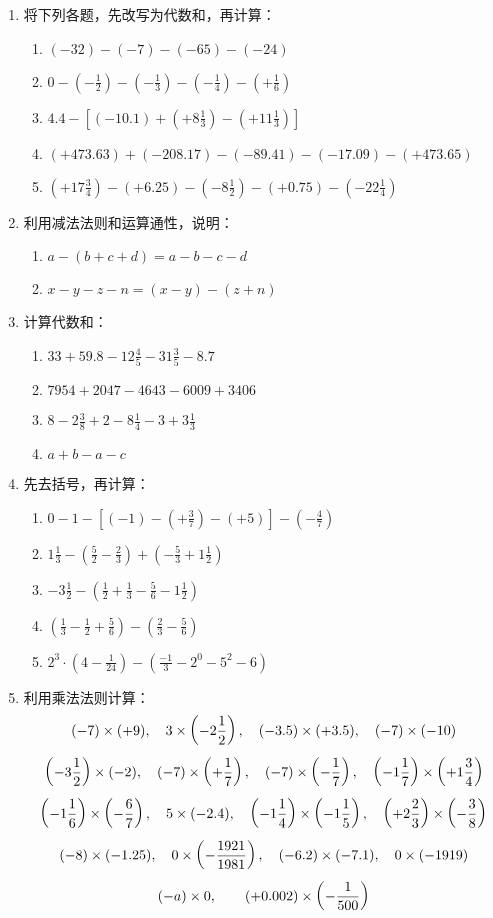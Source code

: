 \begin{enumerate}
	\item 将下列各题，先改写为代数和，再计算：
	\begin{enumerate}
		\item $(-32)-(-7)-(-65)-(-24)$
		\item $0-\left(-\frac{1}{2}\right)-\left(-\frac{1}{3}\right)-\left(-\frac{1}{4}\right)-\left(+\frac{1}{6}\right)$
		\item $4.4-\left[(-10.1)+\left(+8\frac{1}{3}\right)-\left(+11\frac{1}{3}\right)\right]$
		\item $(+473.63)+(-208.17)-(-89.41)-(-17.09)-(+473.65)$
		\item $\left(+17\frac{3}{4}\right)-(+6.25)-\left(-8\frac{1}{2}\right)-(+0.75)-\left(-22\frac{1}{4}\right)$
	\end{enumerate}
	\item 利用减法法则和运算通性，说明：
	\begin{enumerate}
		\item $a-(b+c+d)=a-b-c-d$
		\item $x-y-z-n=(x-y)-(z+n)$
	\end{enumerate}
	\item 计算代数和：
	\begin{enumerate}
		\item $33+59.8-12 \frac{4}{5}-31 \frac{3}{5}-8.7$
		\item $7954+2047-4643-6009+3406$
		\item $8-2 \frac{3}{8}+2-8 \frac{1}{4}-3+3 \frac{1}{3}$
		\item $a+b-a-c$
	\end{enumerate}
	
	\item 
	先去括号，再计算：
	\begin{enumerate}
		\item $0-1-\left[(-1)-\left(+\frac{3}{7}\right)-(+5)\right]-\left(-\frac{4}{7}\right) $
		\item $1 \frac{1}{3}-\left(\frac{5}{2}-\frac{2}{3}\right)+\left(-\frac{5}{3}+1 \frac{1}{2}\right)$
		\item  $-3 \frac{1}{2}-\left(\frac{1}{2}+\frac{1}{3}- \frac{5}{6}-1 \frac{1}{2}\right)$
		\item $\left(\frac{1}{3}-\frac{1}{2}+\frac{5}{6}\right)-\left(\frac{2}{3}-\frac{5}{6}\right)$
		\item $2^{3} \cdot\left(4-\frac{1}{24}\right)-\left(\frac{-1}{3}-2^{0}-5^{2}-6\right)$
	\end{enumerate}
	
	\item 利用乘法法则计算：
	\[(-7)\times (+9),\quad 3\times\left(-2\dfrac{1}{2}\right),\quad (-3.5)\times (+3.5),\quad (-7)\times(-10) \]
	\[ \left(-3\dfrac{1}{2}\right)\times (-2),\quad (-7)\times\left(+\dfrac{1}{7}\right),\quad (-7)\times\left(-\dfrac{1}{7}\right) ,\quad \left(-1\dfrac{1}{7}\right)\times\left(+1\dfrac{3}{4}\right) \]
	\[\left(-1\dfrac{1}{6}\right)\times\left(-\dfrac{6}{7}\right),\quad 5\times (-2.4),\quad \left(-1\dfrac{1}{4}\right)\times\left(-1\dfrac{1}{5}\right),\quad \left(+2\dfrac{2}{3}\right)\times\left(-\dfrac{3}{8}\right) \]
	\[(-8)\times (-1.25),\quad 0\times\left(-\dfrac{1921}{1981}\right),\quad (-6.2)\times (-7.1),\quad 0\times (-1919)\]
	\[(-a)\times 0,\qquad (+0.002)\times \left(-\dfrac{1}{500}\right)\]
	

\end{enumerate}
